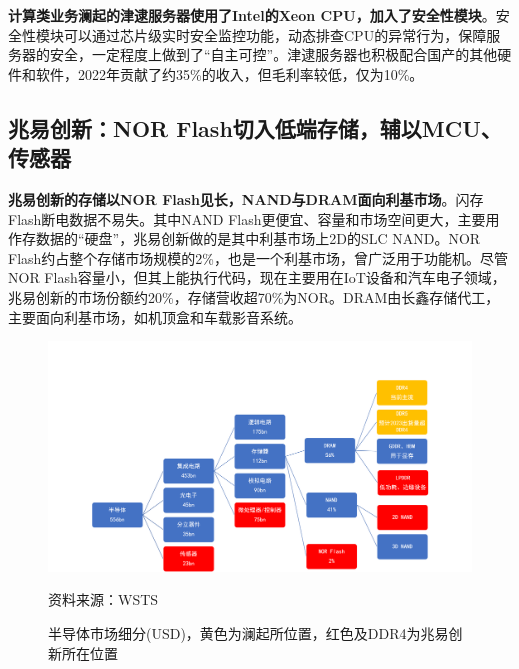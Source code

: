 \documentclass[a4paper,12pt]{ctexart}
\begin{document}
\textbf{计算类业务澜起的津逮服务器使用了Intel的Xeon CPU，加入了安全性模块}。安全性模块可以通过芯片级实时安全监控功能，动态排查CPU的异常行为，保障服务器的安全，一定程度上做到了“自主可控”。津逮服务器也积极配合国产的其他硬件和软件，2022年贡献了约35\%的收入，但毛利率较低，仅为10\%。

\subsection{兆易创新：NOR Flash切入低端存储，辅以MCU、传感器}

\textbf{兆易创新的存储以NOR Flash见长，NAND与DRAM面向利基市场}。闪存Flash断电数据不易失。其中NAND Flash更便宜、容量和市场空间更大，主要用作存数据的“硬盘”，兆易创新做的是其中利基市场上2D的SLC NAND。NOR Flash约占整个存储市场规模的2\%，也是一个利基市场，曾广泛用于功能机。尽管NOR Flash容量小，但其上能执行代码，现在主要用在IoT设备和汽车电子领域，兆易创新的市场份额约20\%，存储营收超70\%为NOR。DRAM由长鑫存储代工，主要面向利基市场，如机顶盒和车载影音系统。
\begin{figure}[H]
    {\centering
        \caption{半导体市场细分(USD)，黄色为澜起所位置，红色及DDR4为兆易创新所在位置}
        \includegraphics[width=\linewidth,trim=0 0 0 80]{img/semi.png}\par}
    \footnotesize{资料来源：WSTS}
\end{figure}
\end{document}
